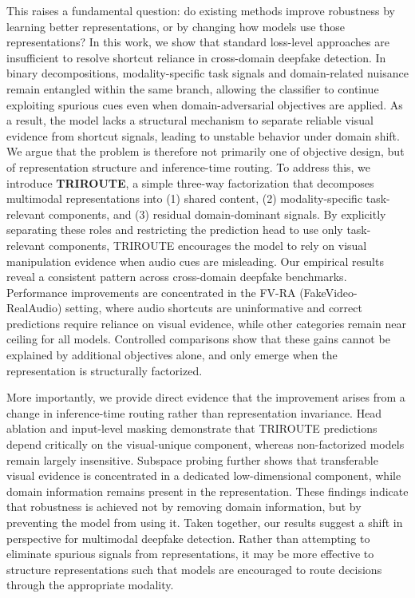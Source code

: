 \documentclass{article}
\begin{document}
This raises a fundamental question: do existing methods improve robustness by learning better representations, or by changing how models use those representations?
In this work, we show that standard loss-level approaches are insufficient to resolve shortcut reliance in cross-domain deepfake detection. In binary decompositions, modality-specific task signals and domain-related nuisance remain entangled within the same branch, allowing the classifier to continue exploiting spurious cues even when domain-adversarial objectives are applied. As a result, the model lacks a structural mechanism to separate reliable visual evidence from shortcut signals, leading to unstable behavior under domain shift.
We argue that the problem is therefore not primarily one of objective design, but of representation structure and inference-time routing. To address this, we introduce \textbf{TRIROUTE}, a simple three-way factorization that decomposes multimodal representations into (1) shared content, (2) modality-specific task-relevant components, and (3) residual domain-dominant signals. By explicitly separating these roles and restricting the prediction head to use only task-relevant components, TRIROUTE encourages the model to rely on visual manipulation evidence when audio cues are misleading.
Our empirical results reveal a consistent pattern across cross-domain deepfake benchmarks. Performance improvements are concentrated in the FV-RA (FakeVideo-RealAudio) setting, where audio shortcuts are uninformative and correct predictions require reliance on visual evidence, while other categories remain near ceiling for all models. Controlled comparisons show that these gains cannot be explained by additional objectives alone, and only emerge when the representation is structurally factorized.

More importantly, we provide direct evidence that the improvement arises from a change in inference-time routing rather than representation invariance. Head ablation and input-level masking demonstrate that TRIROUTE predictions depend critically on the visual-unique component, whereas non-factorized models remain largely insensitive. Subspace probing further shows that transferable visual evidence is concentrated in a dedicated low-dimensional component, while domain information remains present in the representation. These findings indicate that robustness is achieved not by removing domain information, but by preventing the model from using it.
Taken together, our results suggest a shift in perspective for multimodal deepfake detection. Rather than attempting to eliminate spurious signals from representations, it may be more effective to structure representations such that models are encouraged to route decisions through the appropriate modality.
\end{document}
